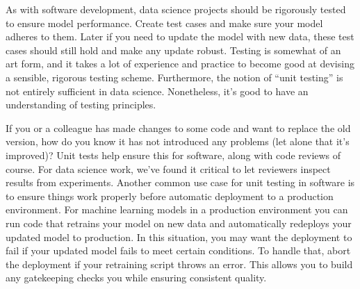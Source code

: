 \documentclass[
]{book}
\begin{document}
As with software development, data science projects should be rigorously tested to ensure model performance. Create test cases and make sure your model adheres to them. Later if you need to update the model with new data, these test cases should still hold and make any update robust. Testing is somewhat of an art form, and it takes a lot of experience and practice to become good at devising a sensible, rigorous testing scheme. Furthermore, the notion of ``unit testing'' is not entirely sufficient in data science. Nonetheless, it's good to have an understanding of testing principles.

If you or a colleague has made changes to some code and want to replace the old version, how do you know it has not introduced any problems (let alone that it's improved)? Unit tests help ensure this for software, along with code reviews of course. For data science work, we've found it critical to let reviewers inspect results from experiments.
Another common use case for unit testing in software is to ensure things work properly before automatic deployment to a production environment.
For machine learning models in a production environment you can run code that retrains your model on new data and automatically redeploys your updated model to production. In this situation, you may want the deployment to fail if your updated model fails to meet certain conditions. To handle that, abort the deployment if your retraining script throws an error. This allows you to build any gatekeeping checks you while ensuring consistent quality.
\end{document}

